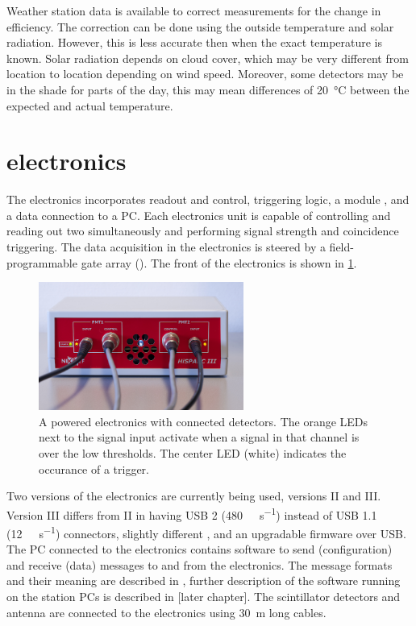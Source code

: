 Weather station data is available to correct measurements for the change in efficiency. The correction can be done using the outside temperature and solar radiation. However, this is less accurate then when the exact \pmt temperature is known. Solar radiation depends on cloud cover, which may be very different from location to location depending on wind speed. Moreover, some detectors may be in the shade for parts of the day, this may mean differences of \SI{20}{\degreeCelsius} between the expected and actual temperature.


\section{\hisparc electronics}

The \hisparc electronics incorporates \pmt readout and control, triggering logic, a \gps module \cite{trimble2007resolutiont}, and a data connection to a PC. Each \hisparc electronics unit is capable of controlling and reading out two \pmts simultaneously and performing signal strength and coincidence triggering. The data acquisition in the electronics is steered by a field-programmable gate array (\fpga). The front of the electronics is shown in \cref{fig:hisparciii_front}.

\begin{figure}
    \centering
    \includegraphics[width=0.6\textwidth]
                    {plots/station/hisparciii_front_power_hit_trigger.png}
    \caption{A powered \hisparc electronics with connected detectors. The orange LEDs next to the signal input activate when a signal in that channel is over the low thresholds. The center LED (white) indicates the occurance of a trigger.}
    \label{fig:hisparciii_front}
\end{figure}

Two versions of the electronics are currently being used, versions II and III. Version III differs from II in having USB 2 (\SI{480}{\mega\bit\per\second}) instead of USB 1.1 (\SI{12}{\mega\bit\per\second}) connectors, slightly different \adcs, and an upgradable firmware over USB. The PC connected to the electronics contains software to send (configuration) and receive (data) messages to and from the \hisparc electronics. The message formats and their meaning are described in \cite{verkooijen2008firmware}, further description of the software running on the station PCs is described in [later chapter]. The scintillator detectors and \gps antenna \cite{trimble2015bullet} are connected to the electronics using \SI{30}{\meter} long cables.


